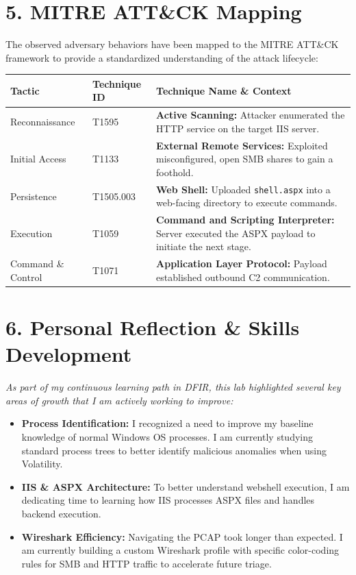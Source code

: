 \documentclass[11pt, a4paper]{article}
\begin{document}
\section*{\textcolor{primary}{5. MITRE ATT\&CK Mapping}}
The observed adversary behaviors have been mapped to the MITRE ATT\&CK framework to provide a standardized understanding of the attack lifecycle:

\vspace{0.2cm}\noindent
\begin{tabularx}{\textwidth}{@{} l l X @{}}
\toprule
\textbf{Tactic} & \textbf{Technique ID} & \textbf{Technique Name \& Context} \\
\midrule
Reconnaissance & T1595 & \textbf{Active Scanning:} Attacker enumerated the HTTP service on the target IIS server. \\
Initial Access & T1133 & \textbf{External Remote Services:} Exploited misconfigured, open SMB shares to gain a foothold. \\
Persistence & T1505.003 & \textbf{Web Shell:} Uploaded \texttt{shell.aspx} into a web-facing directory to execute commands. \\
Execution & T1059 & \textbf{Command and Scripting Interpreter:} Server executed the ASPX payload to initiate the next stage. \\
Command \& Control & T1071 & \textbf{Application Layer Protocol:} Payload established outbound C2 communication. \\
\bottomrule
\end{tabularx}
\vspace{0.5cm}

\section*{\textcolor{primary}{6. Personal Reflection \& Skills Development}}
\textit{As part of my continuous learning path in DFIR, this lab highlighted several key areas of growth that I am actively working to improve:}

\begin{itemize}[label=\textcolor{secondary}{$\bullet$}, itemsep=4pt]
    \item \textbf{Process Identification:} I recognized a need to improve my baseline knowledge of normal Windows OS processes. I am currently studying standard process trees to better identify malicious anomalies when using Volatility.
    \item \textbf{IIS \& ASPX Architecture:} To better understand webshell execution, I am dedicating time to learning how IIS processes ASPX files and handles backend execution.
    \item \textbf{Wireshark Efficiency:} Navigating the PCAP took longer than expected. I am currently building a custom Wireshark profile with specific color-coding rules for SMB and HTTP traffic to accelerate future triage.
\end{itemize}
\end{document}
